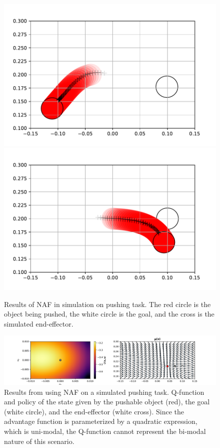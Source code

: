 \begin{figure}[h!]
    \centering
    \includegraphics[width=0.4 \textwidth]{res/naf_sim_failure_mode.pdf}
    \includegraphics[width=0.4 \textwidth]{res/naf_sim_failure_mode_ideal.pdf}

    \caption{Results of NAF in simulation on pushing task. The red circle is
    the object being pushed, the white circle is the goal, and the cross is the
    simulated end-effector.}

    \label{fig:naf_sim_failure}
\end{figure}

\begin{figure}[h!]
    \centering
    \includegraphics[width=1.0 \textwidth]{res/naf_sim_unimode_q.pdf}

    \caption{Results from using NAF on a simulated pushing task. Q-function and
    policy of the state given by the pushable object (red), the goal (white
    circle), and the end-effector (white cross). Since the advantage function
    is parameterized by a quadratic expression, which is uni-modal, the
    Q-function cannot represent the bi-modal nature of this scenario.}

    \label{fig:naf_sim_unimode_q}
\end{figure}
